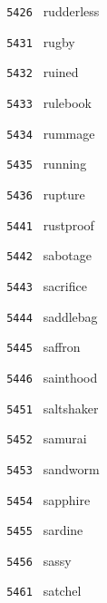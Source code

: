 \documentclass[11pt]{article}
\begin{document}
\begin{multicols}{6}
\noindent \texttt{ 5426 } \hspace{1mm} rudderless  \par
\noindent \texttt{ 5431 } \hspace{1mm} rugby  \par
\noindent \texttt{ 5432 } \hspace{1mm} ruined  \par
\noindent \texttt{ 5433 } \hspace{1mm} rulebook  \par
\noindent \texttt{ 5434 } \hspace{1mm} rummage  \par
\noindent \texttt{ 5435 } \hspace{1mm} running  \par
\noindent \texttt{ 5436 } \hspace{1mm} rupture  \par
\noindent \texttt{ 5441 } \hspace{1mm} rustproof  \par
\noindent \texttt{ 5442 } \hspace{1mm} sabotage  \par
\noindent \texttt{ 5443 } \hspace{1mm} sacrifice  \par
\noindent \texttt{ 5444 } \hspace{1mm} saddlebag  \par
\noindent \texttt{ 5445 } \hspace{1mm} saffron  \par
\noindent \texttt{ 5446 } \hspace{1mm} sainthood  \par
\noindent \texttt{ 5451 } \hspace{1mm} saltshaker  \par
\noindent \texttt{ 5452 } \hspace{1mm} samurai  \par
\noindent \texttt{ 5453 } \hspace{1mm} sandworm  \par
\noindent \texttt{ 5454 } \hspace{1mm} sapphire  \par
\noindent \texttt{ 5455 } \hspace{1mm} sardine  \par
\noindent \texttt{ 5456 } \hspace{1mm} sassy  \par
\noindent \texttt{ 5461 } \hspace{1mm} satchel  \par

\end{multicols}
\end{document}
